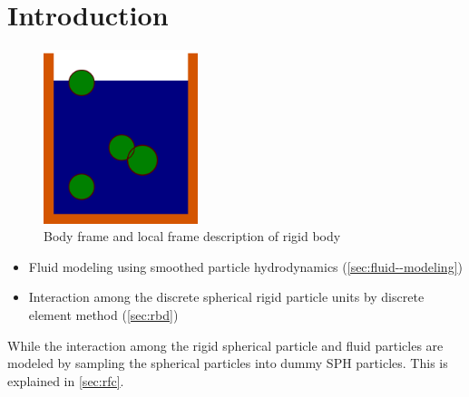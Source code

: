 \documentclass[preprint,12pt]{elsarticle}
\begin{document}


\FloatBarrier%
\section{Introduction}

\begin{figure}[!htpb]
  \centering
  \includegraphics[width=0.4\textwidth]{images/hs_tank_fluid_with_particles}
  \caption{Body frame and local frame description of rigid body}
  \label{fig:gloabl_body_frame_rb}
\end{figure}

\begin{itemize}
\item Fluid modeling using smoothed particle hydrodynamics
  (\cref{sec:fluid--modeling})
\item Interaction among the discrete spherical rigid particle units by
  discrete element method (\cref{sec:rbd})
\end{itemize}

While the interaction among the rigid spherical particle and fluid particles
are modeled by sampling the spherical particles into dummy SPH particles. This
is explained in \cref{sec:rfc}.










\end{document}
